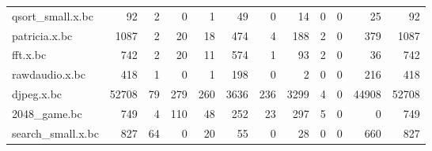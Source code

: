 \begin{table}[ht]
\begin{adjustbox}{width=1.3\textwidth}
\begin{tabular}{lrrrrrrrrrrr}
 qsort\_small.x.bc     &                  92 &                    2 &                          0 &                    1 &                       49 &                                  0 &                            14 &                   0 &                                         0 &                                          25 &                   92 \\
 patricia.x.bc        &                1087 &                    2 &                         20 &                   18 &                      474 &                                  4 &                           188 &                   2 &                                         0 &                                         379 &                 1087 \\
 fft.x.bc             &                 742 &                    2 &                         20 &                   11 &                      574 &                                  1 &                            93 &                   2 &                                         0 &                                          36 &                  742 \\
 rawdaudio.x.bc       &                 418 &                    1 &                          0 &                    1 &                      198 &                                  0 &                             2 &                   0 &                                         0 &                                         216 &                  418 \\
 djpeg.x.bc           &               52708 &                   79 &                        279 &                  260 &                     3636 &                                236 &                          3299 &                   4 &                                         0 &                                       44908 &                52708 \\
 2048\_game.bc         &                 749 &                    4 &                        110 &                   48 &                      252 &                                 23 &                           297 &                   5 &                                         0 &                                           0 &                  749 \\
 search\_small.x.bc    &                 827 &                   64 &                          0 &                   20 &                       55 &                                  0 &                            28 &                   0 &                                         0 &                                         660 &                  827 \\

\end{tabular}
\end{adjustbox}
\end{table}
